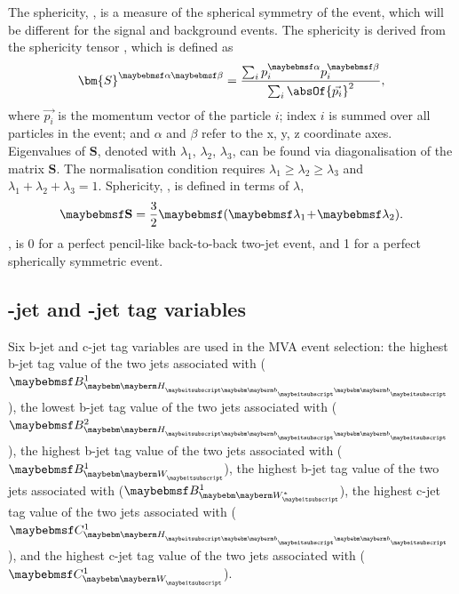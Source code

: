 The sphericity, \sphericity, is a measure of the spherical symmetry of the event, which will be different for the signal and background events. The sphericity is  derived from the sphericity tensor \cite{PhysRevLett.35.1609}, which is  defined as
\begin{equation}
{\bm{S}^{\alpha\beta}} = \frac{\sum_{i}p^{\alpha}_{i}p^{\beta}_{i}}{\sum_{i}\absOf{\vec{p_{i}}}^2},
\end{equation}
where $\vec{p_{i}}$ is the momentum vector of the particle $i$; index $i$ is summed over all particles in the event; and $\alpha$ and $\beta$ refer to the x, y, z coordinate axes. Eigenvalues of $\bm{S}$, denoted with $\lambda_{1}$, $\lambda_{2}$, $\lambda_{3}$, can be found via diagonalisation of the matrix $\bm{S}$. The normalisation condition requires $\lambda_{1}\!\geqslant\! \lambda_{2} \! \geqslant \! \lambda_{3}$ and $ \lambda_{1} \! + \! \lambda_{2} \! + \! \lambda_{3} \! = \! 1 $. Sphericity, \sphericity, is defined in terms of $\lambda$,
\begin{equation}
\sphericity = \frac{3}{2}\parenths{\lambda_{1} \! + \! \lambda_{2}}.
\end{equation}
\sphericity, is 0 for a perfect pencil-like back-to-back two-jet event, and 1 for a perfect spherically symmetric event.


\subsection{\Pbottom-jet and \Pcharm-jet tag  variables}

Six b-jet and c-jet tag variables are used in the MVA event selection: the highest b-jet tag value of the two jets associated with \Hbb ($\btagFull{1}{\Hbb}$), the lowest b-jet tag value of the two jets associated with \Hbb ($\btagFull{2}{\Hbb}$), the highest b-jet tag value of the two jets associated with \PW ($\btagFull{1}{\PW}$), the highest b-jet tag value of the two jets associated with \W* ($\btagFull{1}{\W*}$), the highest c-jet tag value of the two jets associated with \Hbb ($\ctagFull{1}{\Hbb}$), and the highest c-jet tag value of the two jets associated with \PW ($\ctagFull{1}{\PW}$).

